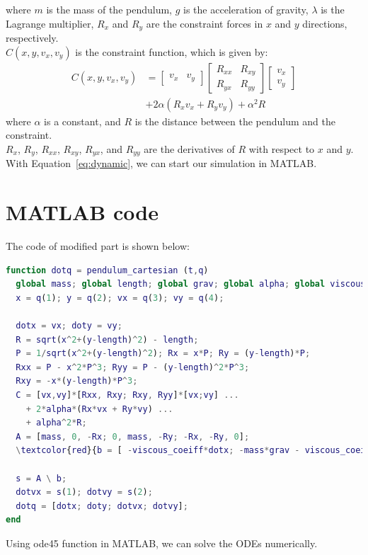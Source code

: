 \documentclass{article}
\begin{document}
where $m$ is the mass of the pendulum, $g$ is the acceleration of gravity, $\lambda$ is the Lagrange multiplier, $R_x$ and $R_y$ are the constraint forces in $x$ and $y$ directions, respectively.\\
$C\left(x, y, v_x, v_y\right)$ is the constraint function, which is given by:
\begin{equation}
  \begin{aligned}
  C\left(x, y, v_x, v_y\right) & =\left[\begin{array}{ll}
  v_x & v_y
  \end{array}\right]\left[\begin{array}{ll}
  R_{x x} & R_{x y} \\
  R_{y x} & R_{y y}
  \end{array}\right]\left[\begin{array}{l}
  v_x \\
  v_y
  \end{array}\right] \\
  & +2 \alpha\left(R_x v_x+R_y v_y\right)+\alpha^2 R
  \end{aligned}
  \end{equation}
where $\alpha$ is a constant, and $R$ is the distance between the pendulum and the constraint.\\
$R_x$, $R_y$, $R_{x x}$, $R_{x y}$, $R_{y x}$, and $R_{y y}$ are the derivatives of $R$ with respect to $x$ and $y$.\\
With Equation~\ref{eq:dynamic}, we can start our simulation in MATLAB.
\newpage
\section*{MATLAB code}
The code of modified part is shown below:
\begin{center}
\begin{lstlisting}[language=Matlab, caption={MATLAB code for pendulum simulation}, basicstyle=\small\ttfamily]
function dotq = pendulum_cartesian (t,q)
  global mass; global length; global grav; global alpha; global viscous_coeiff;
  x = q(1); y = q(2); vx = q(3); vy = q(4);
  
  dotx = vx; doty = vy;
  R = sqrt(x^2+(y-length)^2) - length;
  P = 1/sqrt(x^2+(y-length)^2); Rx = x*P; Ry = (y-length)*P;
  Rxx = P - x^2*P^3; Ryy = P - (y-length)^2*P^3;
  Rxy = -x*(y-length)*P^3;
  C = [vx,vy]*[Rxx, Rxy; Rxy, Ryy]*[vx;vy] ...
    + 2*alpha*(Rx*vx + Ry*vy) ...
    + alpha^2*R;
  A = [mass, 0, -Rx; 0, mass, -Ry; -Rx, -Ry, 0];
  \textcolor{red}{b = [ -viscous_coeiff*dotx; -mass*grav - viscous_coeiff*doty; C ];}

  s = A \ b;
  dotvx = s(1); dotvy = s(2);
  dotq = [dotx; doty; dotvx; dotvy];
end
\end{lstlisting}
\end{center}
Using ode45 function in MATLAB, we can solve the ODEs numerically.\\
\end{document}
